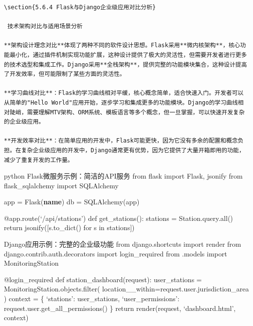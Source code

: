 \begin{lstlisting}
\section{5.6.4 Flask与Django企业级应用对比分析}

 技术架构对比与适用场景分析

**架构设计理念对比**体现了两种不同的软件设计思想。Flask采用**微内核架构**，核心功能最小化，通过插件机制实现功能扩展，这种设计提供了极大的灵活性，但需要开发者进行更多的技术选型和集成工作。Django采用**全栈架构**，提供完整的功能模块集合，这种设计提高了开发效率，但可能限制了某些方面的灵活性。

**学习曲线对比**：Flask的学习曲线相对平缓，核心概念简单，适合快速入门。开发者可以从简单的"Hello World"应用开始，逐步学习和集成更多的功能模块。Django的学习曲线相对陡峭，需要理解MTV架构、ORM系统、模板语言等多个概念，但一旦掌握，可以快速开发复杂的企业级应用。

**开发效率对比**：在简单应用的开发中，Flask可能更快，因为它没有多余的配置和概念负担。在复杂企业级应用的开发中，Django通常更有优势，因为它提供了大量开箱即用的功能，减少了重复开发的工作量。
\end{lstlisting}

python  Flask微服务示例：简洁的API服务 from flask import Flask, jsonify from flask\_sqlalchemy import SQLAlchemy

app = Flask(\textbf{name}) db = SQLAlchemy(app)

@app.route(`/api/stations') def get\_stations(): stations = Station.query.all() return jsonify({[}s.to\_dict() for s in stations{]})

 Django应用示例：完整的企业级功能 from django.shortcuts import render from django.contrib.auth.decorators import login\_required from .models import MonitoringStation

@login\_required def station\_dashboard(request): user\_stations = MonitoringStation.objects.filter( location\_\_within=request.user.jurisdiction\_area ) context = \{ `stations': user\_stations, `user\_permissions': request.user.get\_all\_permissions() \} return render(request, `dashboard.html', context)

